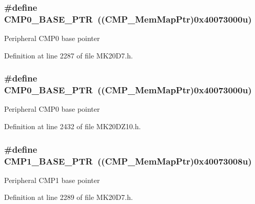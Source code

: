 \subsubsection[{\texorpdfstring{C\+M\+P0\+\_\+\+B\+A\+S\+E\+\_\+\+P\+TR}{CMP0_BASE_PTR}}]{\setlength{\rightskip}{0pt plus 5cm}\#define C\+M\+P0\+\_\+\+B\+A\+S\+E\+\_\+\+P\+TR~(({\bf C\+M\+P\+\_\+\+Mem\+Map\+Ptr})0x40073000u)}\hypertarget{group___c_m_p___peripheral_ga5a7a6b1d0743a05435ba5cb2dc2b3431}{}\label{group___c_m_p___peripheral_ga5a7a6b1d0743a05435ba5cb2dc2b3431}
Peripheral C\+M\+P0 base pointer 

Definition at line 2287 of file M\+K20\+D7.\+h.

\subsubsection[{\texorpdfstring{C\+M\+P0\+\_\+\+B\+A\+S\+E\+\_\+\+P\+TR}{CMP0_BASE_PTR}}]{\setlength{\rightskip}{0pt plus 5cm}\#define C\+M\+P0\+\_\+\+B\+A\+S\+E\+\_\+\+P\+TR~(({\bf C\+M\+P\+\_\+\+Mem\+Map\+Ptr})0x40073000u)}\hypertarget{group___c_m_p___peripheral_ga5a7a6b1d0743a05435ba5cb2dc2b3431}{}\label{group___c_m_p___peripheral_ga5a7a6b1d0743a05435ba5cb2dc2b3431}
Peripheral C\+M\+P0 base pointer 

Definition at line 2432 of file M\+K20\+D\+Z10.\+h.

\subsubsection[{\texorpdfstring{C\+M\+P1\+\_\+\+B\+A\+S\+E\+\_\+\+P\+TR}{CMP1_BASE_PTR}}]{\setlength{\rightskip}{0pt plus 5cm}\#define C\+M\+P1\+\_\+\+B\+A\+S\+E\+\_\+\+P\+TR~(({\bf C\+M\+P\+\_\+\+Mem\+Map\+Ptr})0x40073008u)}\hypertarget{group___c_m_p___peripheral_ga91e89d9d49a3f251dcd9026ad403a3e8}{}\label{group___c_m_p___peripheral_ga91e89d9d49a3f251dcd9026ad403a3e8}
Peripheral C\+M\+P1 base pointer 

Definition at line 2289 of file M\+K20\+D7.\+h.

